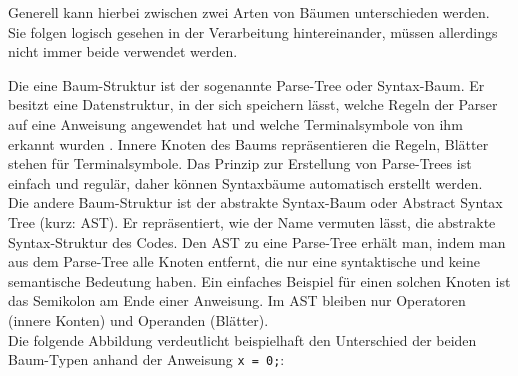 Generell kann hierbei zwischen zwei Arten von Bäumen unterschieden werden. Sie folgen logisch gesehen in der Verarbeitung hintereinander, müssen allerdings nicht immer beide verwendet werden.

Die eine Baum-Struktur ist der sogenannte Parse-Tree oder Syntax-Baum. Er besitzt eine Datenstruktur, in der sich speichern lässt, welche Regeln der Parser auf eine Anweisung angewendet hat und welche Terminalsymbole von ihm erkannt wurden \cite{book:parrLang}. Innere Knoten des Baums repräsentieren die Regeln, Blätter stehen für Terminalsymbole. Das Prinzip zur Erstellung von Parse-Trees ist einfach und regulär, daher können Syntaxbäume automatisch erstellt werden.\\
Die andere Baum-Struktur ist der abstrakte Syntax-Baum oder Abstract Syntax Tree (kurz: AST). Er repräsentiert, wie der Name vermuten lässt, die abstrakte Syntax-Struktur des Codes. Den AST zu eine Parse-Tree erhält man, indem man aus dem Parse-Tree alle Knoten entfernt, die nur eine syntaktische und keine semantische Bedeutung haben\cite{book:parrLang}. Ein einfaches Beispiel für einen solchen Knoten ist das Semikolon am Ende einer Anweisung. Im AST bleiben nur Operatoren (innere Konten) und Operanden (Blätter).\\
Die folgende Abbildung verdeutlicht beispielhaft den Unterschied der beiden Baum-Typen anhand der Anweisung \texttt{x = 0;}:

